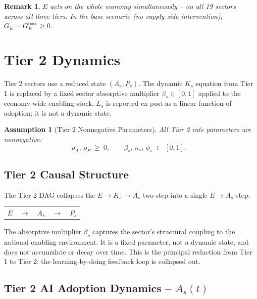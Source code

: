 \documentclass[11pt,a4paper]{article}
\newtheorem{assumption}{Assumption}
\newtheorem{remark}{Remark}
\begin{document}
\begin{remark}
$E$ acts on the whole economy simultaneously -- on all 19 sectors across all three tiers. In the base scenario (no supply-side intervention), $G_E = G_E^{\text{base}} \geq 0$.
\end{remark}

\section{Tier 2 Dynamics}
\label{sec:tier2}

Tier 2 sectors use a reduced state $(A_s, P_s)$. The dynamic $K_s$ equation from Tier 1 is replaced by a fixed sector absorptive multiplier $\beta_s \in [0,1]$ applied to the economy-wide enabling stock. $L_s$ is reported ex-post as a linear function of adoption; it is not a dynamic state.

\begin{assumption}[Tier 2 Nonnegative Parameters]
All Tier 2 rate parameters are nonnegative:
\[
\rho_A,\, \rho_P \;\geq\; 0, \qquad \beta_s,\, \kappa_s,\, \phi_s \;\in\; [0,1].
\]
\end{assumption}

\subsection{Tier 2 Causal Structure}

The Tier 2 DAG collapses the $E \to K_s \to A_s$ two-step into a single $E \to A_s$ step:

\begin{center}
\begin{tabular}{ccccc}
$E$ & $\rightarrow$ & $A_s$ & $\rightarrow$ & $P_s$ \\
\end{tabular}
\end{center}

The absorptive multiplier $\beta_s$ captures the sector's structural coupling to the national enabling environment. It is a fixed parameter, not a dynamic state, and does not accumulate or decay over time. This is the principal reduction from Tier 1 to Tier 2: the learning-by-doing feedback loop is collapsed out.

\subsection{Tier 2 AI Adoption Dynamics -- \texorpdfstring{$A_s(t)$}{As(t)}}
\end{document}
